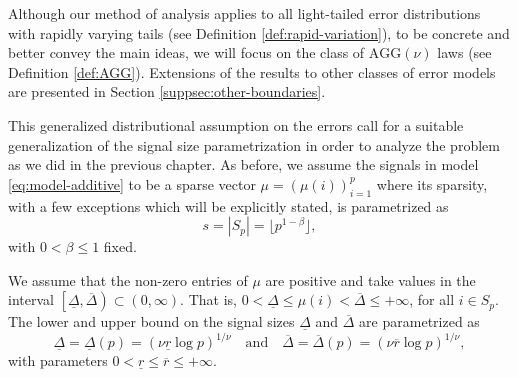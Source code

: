 Although our method of analysis applies to all light-tailed error distributions with rapidly varying tails (see Definition \ref{def:rapid-variation}), to be concrete and better convey the main ideas, we will focus on the class of $\mathrm{AGG}(\nu)$ laws (see Definition \ref{def:AGG}).
Extensions of the results to other classes of error models are presented in Section \ref{suppsec:other-boundaries}.

This generalized distributional assumption on the errors call for a suitable generalization of the signal size parametrization in order to analyze the problem as we did in the previous chapter.
As before, we assume the signals in model \eqref{eq:model-additive} to be a sparse vector $\mu = \left(\mu(i)\right)_{i=1}^p$ where its sparsity, with a few exceptions which will be explicitly stated, is parametrized as
\begin{equation} \label{eq:sparsity-parametrized}
    s = |S_p| = \lfloor p^{1 -\beta} \rfloor, %
\end{equation}
with $0 < \beta \le 1$ fixed.

We assume that the non-zero entries of $\mu$ are positive and take values in the interval $\left[\underline{\Delta},\overline{\Delta}\right)\subset (0,\infty)$.
That is, $0<\underline{\Delta}\le\mu(i)<\overline{\Delta}\le+\infty$, for all $i\in S_p$.
The lower and upper bound on the signal sizes $\underline{\Delta}$ and $\overline{\Delta}$ are parametrized as
\begin{equation} \label{eq:signal-size-parametrized}
    \underline{\Delta} = \underline{\Delta}(p) = (\nu \underline{r} \log{p})^{1/\nu} \quad \text{and} \quad
    \overline{\Delta} = \overline{\Delta}(p)  = (\nu \overline{r} \log{p})^{1/\nu},
\end{equation}
with parameters $0 < \underline{r} \le \overline{r} \le +\infty$.

\medskip

